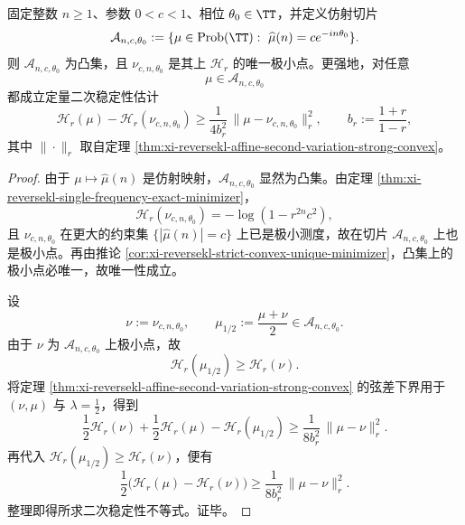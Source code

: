 \begin{theorem}[固定相位切片上的二次稳定性]\label{thm:conclusion-reversekl-affine-phase-slice-quadratic-stability}
固定整数 \(n\ge 1\)、参数 \(0<c<1\)、相位 \(\theta_0\in\TT\)，并定义仿射切片
\[
\mathcal A_{n,c,\theta_0}
:=
\{\mu\in\mathrm{Prob}(\TT):\ \widehat\mu(n)=ce^{-in\theta_0}\}.
\]
则 \(\mathcal A_{n,c,\theta_0}\) 为凸集，且 \(\nu_{c,n,\theta_0}\) 是其上 \(\mathcal H_r\) 的唯一极小点。更强地，对任意
\[
\mu\in\mathcal A_{n,c,\theta_0}
\]
都成立定量二次稳定性估计
\[
\mathcal H_r(\mu)-\mathcal H_r(\nu_{c,n,\theta_0})
\ge
\frac{1}{4b_r^2}\,\|\mu-\nu_{c,n,\theta_0}\|_r^2,
\qquad
b_r:=\frac{1+r}{1-r},
\]
其中 \(\|\cdot\|_r\) 取自定理 \ref{thm:xi-reversekl-affine-second-variation-strong-convex}。
\end{theorem}
\begin{proof}
由于 \(\mu\mapsto \widehat\mu(n)\) 是仿射映射，\(\mathcal A_{n,c,\theta_0}\) 显然为凸集。由定理 \ref{thm:xi-reversekl-single-frequency-exact-minimizer}，
\[
\mathcal H_r(\nu_{c,n,\theta_0})=-\log(1-r^{2n}c^2),
\]
且 \(\nu_{c,n,\theta_0}\) 在更大的约束集 \(\{|\widehat\mu(n)|=c\}\) 上已是极小测度，故在切片 \(\mathcal A_{n,c,\theta_0}\) 上也是极小点。再由推论 \ref{cor:xi-reversekl-strict-convex-unique-minimizer}，凸集上的极小点必唯一，故唯一性成立。

设
\[
\nu:=\nu_{c,n,\theta_0},
\qquad
\mu_{1/2}:=\frac{\mu+\nu}{2}\in\mathcal A_{n,c,\theta_0}.
\]
由于 \(\nu\) 为 \(\mathcal A_{n,c,\theta_0}\) 上极小点，故
\[
\mathcal H_r(\mu_{1/2})\ge \mathcal H_r(\nu).
\]
将定理 \ref{thm:xi-reversekl-affine-second-variation-strong-convex} 的弦差下界用于 \((\nu,\mu)\) 与 \(\lambda=\frac12\)，得到
\[
\frac12\mathcal H_r(\nu)+\frac12\mathcal H_r(\mu)-\mathcal H_r(\mu_{1/2})
\ge
\frac{1}{8b_r^2}\,\|\mu-\nu\|_r^2.
\]
再代入 \(\mathcal H_r(\mu_{1/2})\ge \mathcal H_r(\nu)\)，便有
\[
\frac12\bigl(\mathcal H_r(\mu)-\mathcal H_r(\nu)\bigr)
\ge
\frac{1}{8b_r^2}\,\|\mu-\nu\|_r^2.
\]
整理即得所求二次稳定性不等式。证毕。
\end{proof}

